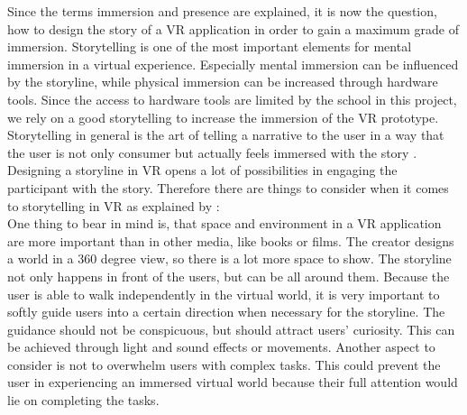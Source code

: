 Since the terms immersion and presence are explained, it is now the question, how to design the story of a VR application in order to gain a maximum grade of immersion. Storytelling is one of the most important elements for mental immersion in a virtual experience. Especially mental immersion can be influenced by the storyline, while physical immersion can be increased through hardware tools. Since the  access to hardware tools are limited by the school in this project, we rely on a good storytelling to increase the immersion of the VR prototype. \\
Storytelling in general is the art of telling a narrative to the user in a way that the user is not only consumer but actually feels immersed with the story \cite{Louden.2018}. Designing a storyline in VR opens a lot of possibilities in engaging the participant with the story. Therefore there are things to consider when it comes to storytelling in VR as explained by \cite{Keane.2018}:\\
One thing to bear in mind is, that space and environment in a VR application are more important than in other media, like books or films. The creator designs a world in a 360 degree view, so there is a lot more space to show. The storyline not only happens in front of the users, but can be all around them. Because the user is able to walk independently in the virtual world, it is very important to softly guide users into a certain direction when necessary for the storyline. The guidance should not be conspicuous, but should attract  users' curiosity. This can be achieved through light and sound effects or movements. Another aspect to consider is not to overwhelm  users with complex tasks. This could prevent the user in experiencing an immersed virtual world because their full attention would lie on completing the tasks.
